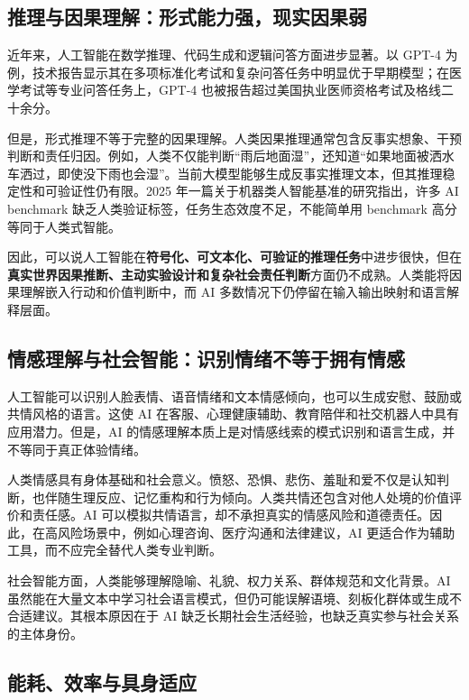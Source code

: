 \documentclass[UTF8,zihao=5,a4paper]{ctexart}
\begin{document}
\subsection{推理与因果理解：形式能力强，现实因果弱}

近年来，人工智能在数学推理、代码生成和逻辑问答方面进步显著。以 GPT-4 为例，技术报告显示其在多项标准化考试和复杂问答任务中明显优于早期模型；在医学考试等专业问答任务上，GPT-4 也被报告超过美国执业医师资格考试及格线二十余分\cite{openai2023gpt4,nori2023gpt4medical}。

但是，形式推理不等于完整的因果理解。人类因果推理通常包含反事实想象、干预判断和责任归因。例如，人类不仅能判断“雨后地面湿”，还知道“如果地面被洒水车洒过，即使没下雨也会湿”。当前大模型能够生成反事实推理文本，但其推理稳定性和可验证性仍有限。2025 年一篇关于机器类人智能基准的研究指出，许多 AI benchmark 缺乏人类验证标签，任务生态效度不足，不能简单用 benchmark 高分等同于人类式智能\cite{ying2025benchmarking}。

因此，可以说人工智能在\textbf{符号化、可文本化、可验证的推理任务}中进步很快，但在\textbf{真实世界因果推断、主动实验设计和复杂社会责任判断}方面仍不成熟。人类能将因果理解嵌入行动和价值判断中，而 AI 多数情况下仍停留在输入输出映射和语言解释层面。

\subsection{情感理解与社会智能：识别情绪不等于拥有情感}

人工智能可以识别人脸表情、语音情绪和文本情感倾向，也可以生成安慰、鼓励或共情风格的语言。这使 AI 在客服、心理健康辅助、教育陪伴和社交机器人中具有应用潜力。但是，AI 的情感理解本质上是对情感线索的模式识别和语言生成，并不等同于真正体验情绪。

人类情感具有身体基础和社会意义。愤怒、恐惧、悲伤、羞耻和爱不仅是认知判断，也伴随生理反应、记忆重构和行为倾向。人类共情还包含对他人处境的价值评价和责任感。AI 可以模拟共情语言，却不承担真实的情感风险和道德责任。因此，在高风险场景中，例如心理咨询、医疗沟通和法律建议，AI 更适合作为辅助工具，而不应完全替代人类专业判断。

社会智能方面，人类能够理解隐喻、礼貌、权力关系、群体规范和文化背景。AI 虽然能在大量文本中学习社会语言模式，但仍可能误解语境、刻板化群体或生成不合适建议。其根本原因在于 AI 缺乏长期社会生活经验，也缺乏真实参与社会关系的主体身份。

\subsection{能耗、效率与具身适应}
\end{document}
